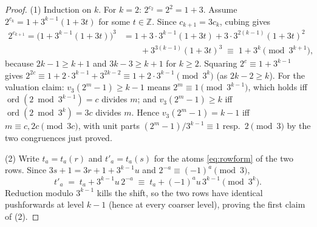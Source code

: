 \documentclass[11pt]{amsart}
\theoremstyle{definition}
\theoremstyle{remark}
\newcommand{\Z}{\mathbb{Z}}
\begin{document}
\begin{proof}
(1) Induction on $k$. For $k = 2$: $2^{c_2} = 2^2 = 1 + 3$. Assume $2^{c_k} = 1 + 3^{k-1}(1 + 3t)$ for some $t \in \Z$. Since $c_{k+1} = 3c_k$, cubing gives
\begin{align*}
2^{c_{k+1}} = \bigl(1 + 3^{k-1}(1+3t)\bigr)^3
&= 1 + 3\cdot 3^{k-1}(1+3t) + 3\cdot 3^{2(k-1)}(1+3t)^2 \\
&\qquad + 3^{3(k-1)}(1+3t)^3
\;\equiv\; 1 + 3^{k} \pmod{3^{k+1}},
\end{align*}
because $2k - 1 \ge k + 1$ and $3k - 3 \ge k + 1$ for $k \ge 2$. Squaring $2^c \equiv 1 + 3^{k-1}$ gives $2^{2c} \equiv 1 + 2\cdot 3^{k-1} + 3^{2k-2} \equiv 1 + 2 \cdot 3^{k-1} \pmod{3^k}$ (as $2k-2 \ge k$). For the valuation claim: $v_3(2^m-1) \ge k-1$ means $2^m \equiv 1 \pmod{3^{k-1}}$, which holds iff $\operatorname{ord}(2 \bmod 3^{k-1}) = c$ divides $m$; and $v_3(2^m - 1) \ge k$ iff $\operatorname{ord}(2 \bmod 3^{k}) = 3c$ divides $m$. Hence $v_3(2^m-1) = k-1$ iff $m \equiv c, 2c \pmod{3c}$, with unit parts $(2^m-1)/3^{k-1} \equiv 1$ resp.\ $2 \pmod 3$ by the two congruences just proved.

(2) Write $t_a = t_a(r)$ and $t'_a = t_a(s)$ for the atoms \eqref{eq:rowform} of the two rows. Since $3s + 1 = 3r + 1 + 3^{k-1}u$ and $2^{-a} \equiv (-1)^a \pmod 3$,
\[
t'_a \;=\; t_a + 3^{k-1} u\, 2^{-a} \;\equiv\; t_a + (-1)^a u\, 3^{k-1} \pmod{3^k}.
\]
Reduction modulo $3^{k-1}$ kills the shift, so the two rows have identical pushforwards at level $k-1$ (hence at every coarser level), proving the first claim of (2).


\end{proof}
\end{document}
